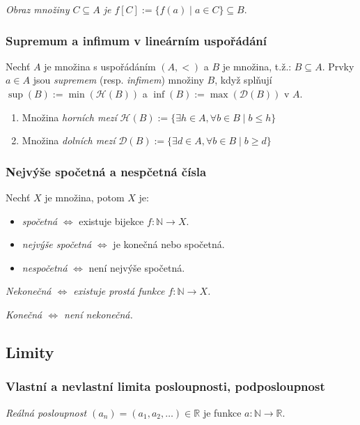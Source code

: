 \documentclass[10pt,a4paper]{article}
\newcommand{\N}{{\mathbb{N}}}
\newcommand{\R}{{\mathbb{R}}}
\begin{document}
\textit{Obraz množiny $C \subseteq A$ je $f[C]:=\{f(a) \mid a \in C\} \subseteq B$}.

\subsubsection{Supremum a infimum v lineárním uspořádání}

Nechť $A$ je množina s uspořádáním $(A, <)$ a $B$ je množina, t.ž.: $B \subseteq A$. 
Prvky $a\in A$ jsou \textit{supremem} (resp. \textit{infimem}) množiny $B$, když splňují $\sup (B) := \min (\mathcal{H}(B))$ a $\inf (B) := \max (\mathcal{D}(B))$ v $A$.

\begin{enumerate}
    \item Množina \textit{horních mezí} \(\mathcal{H}(B) := \{\exists h \in A, \forall b \in B \mid b\leq h\}\)
    \item Množina \textit{dolních mezí} \(\mathcal{D}(B) := \{\exists d \in A, \forall b \in B \mid b\geq d\}\)
\end{enumerate}

\subsubsection{Nejvýše spočetná a nespčetná čísla}

Nechť $X$ je množina, potom $X$ je:

\begin{itemize}
    \item \textit{spočetná} $\iff$ existuje bijekce $f: \N \to X$.
    \item \textit{nejvýše spočetná} $\iff$ je konečná nebo spočetná.
    \item \textit{nespočetná} $\iff$ není nejvýše spočetná.
\end{itemize}

\textit{Nekonečná $\iff$ existuje prostá funkce $f:\N \to X$.}

\textit{Konečná $\iff$ není nekonečná.}

\subsection{Limity}
\subsubsection{Vlastní a nevlastní limita posloupnosti, podposloupnost}
\textit{Reálná posloupnost $(a_n) = (a_1, a_2, \dots) \in \R$} je funkce $a: \N \to \R$.
\end{document}
